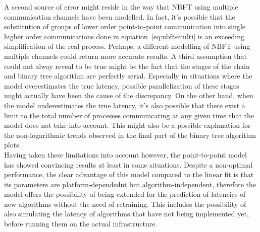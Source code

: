 \documentclass[../main.tex]{subfiles}
\begin{document}
A second source of error might reside in the way that NBFT using multiple communication channels have been modelled. In fact, it's possible that the sobstitution of groups of lower order point-to-point communication into single higher order communications done in equation~\ref{eq:nbft-multi} is an exceeding simplification of the real process. Perhaps, a different modelling of NBFT using multiple channels could return more accurate results. A third assumption that could not alway reveal to be true might be the fact that the stages of the chain and binary tree algorithm are perfectly serial. Especially in situations where the model overestimates the true latency, possible parallelization of these stages might actually have been the cause of the discrepancy. On the other hand, when the model underestimates the true latency, it's also possible that there exist a limit to the total number of processes communicating at any given time that the model does not take into account. This might also be a possible explanation for the non-logarithmic trends observed in the final part of the binary tree algorithm plots.\\
Having taken these limitations into account however, the point-to-point model has showed convincing results at least in some situations. Despite a non-optimal performance, the clear advantage of this model compared to the linear fit is that its parameters are platform-dependednt but algorithm-independent, therefore the model offers the possibility of being extended for the prediction of latencies of new algorithms without the need of retraining. This includes the possibility of also simulating the latency of algorithms that have not being implemented yet, before running them on the actual infrastructure.\\
\end{document}
